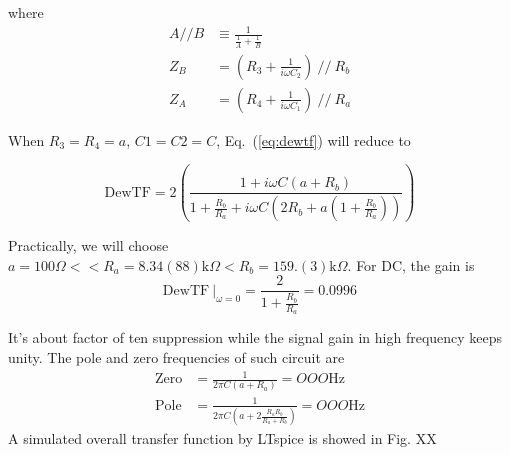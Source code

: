 where
\begin{align}
    A//B &\equiv \frac{1}{\frac{1}{A}+\frac{1}{B}} \\
    Z_B &= ( R_3 + \frac{1}{i \omega C_2} )~ //~ R_b \\
    Z_A &= ( R_4 + \frac{1}{i \omega C_1} )~ //~ R_a
\end{align}

When $R_3=R_4=a$, $C1=C2=C$, Eq.~(\ref{eq:dewtf}) will reduce to 

\begin{equation}
    \mathrm{DewTF} = 2 \left( \frac{1+i \omega C (a+ R_b)}{1+\frac{R_b}{R_a} + i \omega C (2 R_b + a(1+\frac{R_b}{R_a}))} \right)
\end{equation}

Practically, we will choose $a=100\Omega << R_a =8.34(88)\mathrm{k}\Omega < R_b =159.(3)\mathrm{k}\Omega $. For DC, the gain is 
\begin{equation}
    \mathrm{DewTF}\ \rvert_{\omega=0} = \frac{2}{1+\frac{R_b}{R_a}} = 0.0996
\end{equation}

It's about factor of ten suppression while the signal gain in high frequency keeps unity.
The pole and zero frequencies of such circuit are
\begin{align}
    \mathrm{Zero} &= \frac{1}{2 \pi C (a+R_a)} = OOO \mathrm{Hz} \\
    \mathrm{Pole} &= \frac{1}{2 \pi C (a+2\frac{R_a R_b}{R_a+R_b})} = OOO \mathrm{Hz}
\end{align}
 A simulated overall transfer function by LTspice is showed in Fig. XX 

